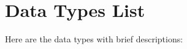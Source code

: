 \section{Data Types List}
Here are the data types with brief descriptions\+:\begin{DoxyCompactList}
\item{}
\end{DoxyCompactList}
